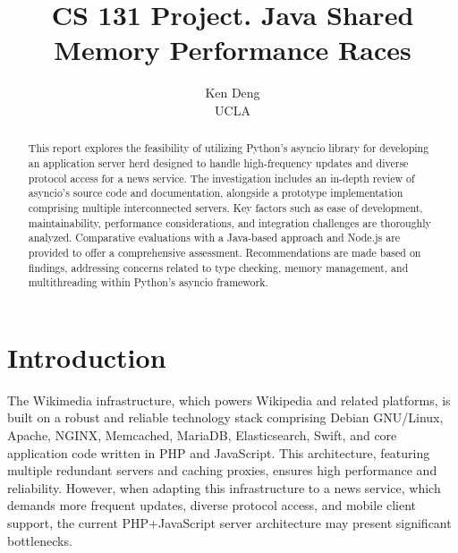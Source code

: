 \documentclass[letterpaper,twocolumn,10pt]{article}
\begin{document}

\date{}

\title{\Large \bf CS 131 Project. Java Shared Memory Performance Races}

\author{
{Ken Deng}\\
UCLA
} %

\maketitle

\begin{abstract}
This report explores the feasibility of utilizing Python's asyncio library for developing an application server herd designed to handle high-frequency updates and diverse protocol access for a news service. The investigation includes an in-depth review of asyncio's source code and documentation, alongside a prototype implementation comprising multiple interconnected servers. Key factors such as ease of development, maintainability, performance considerations, and integration challenges are thoroughly analyzed. Comparative evaluations with a Java-based approach and Node.js are provided to offer a comprehensive assessment. Recommendations are made based on findings, addressing concerns related to type checking, memory management, and multithreading within Python's asyncio framework.
\end{abstract}
\section{Introduction}
The Wikimedia infrastructure, which powers Wikipedia and related platforms, is built on a robust and reliable technology stack comprising Debian GNU/Linux, Apache, NGINX, Memcached, MariaDB, Elasticsearch, Swift, and core application code written in PHP and JavaScript. This architecture, featuring multiple redundant servers and caching proxies, ensures high performance and reliability. However, when adapting this infrastructure to a news service, which demands more frequent updates, diverse protocol access, and mobile client support, the current PHP+JavaScript server architecture may present significant bottlenecks.
\vspace{5pt}
\end{document}
